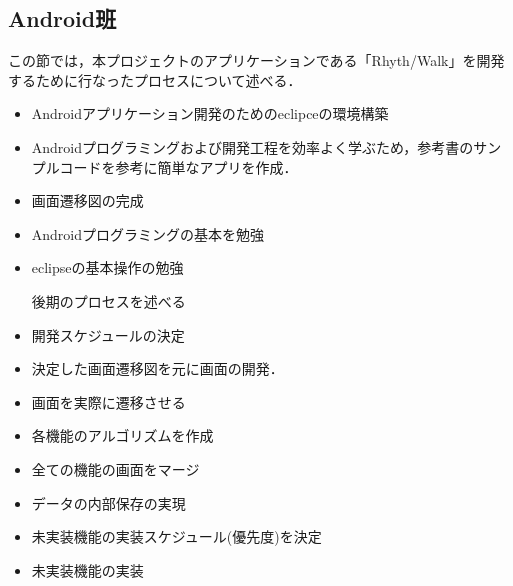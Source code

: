 \subsection{Android班}

\par この節では，本プロジェクトのアプリケーションである「Rhyth/Walk」を開発するために行なったプロセスについて述べる．

\begin{itemize}

\item Androidアプリケーション開発のためのeclipceの環境構築
\item Androidプログラミングおよび開発工程を効率よく学ぶため，参考書のサンプルコードを参考に簡単なアプリを作成．
\item 画面遷移図の完成
\item Androidプログラミングの基本を勉強
\item eclipseの基本操作の勉強

\par 後期のプロセスを述べる
\item 開発スケジュールの決定
\item 決定した画面遷移図を元に画面の開発．
\item 画面を実際に遷移させる
\item 各機能のアルゴリズムを作成
\item 全ての機能の画面をマージ
\item データの内部保存の実現
\item 未実装機能の実装スケジュール(優先度)を決定
\item 未実装機能の実装

\end{itemize}
 
